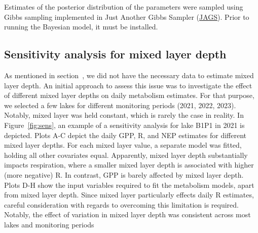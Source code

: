 \documentclass[11pt,lineno]{manuscript}\usepackage[]{graphicx}\usepackage[]{xcolor}
\begin{document}
Estimates of the posterior distribution of the parameters were sampled using
Gibbs sampling implemented in Just Another Gibbs Sampler
(\href{https://sourceforge.net/projects/mcmc-jags/files/}{JAGS}). Prior to running
the Bayesian model, it must be installed.

\subsection{Sensitivity analysis for mixed layer depth} \label{subsec:sens}

As mentioned in section~, we did not have the necessary
data to estimate mixed layer depth. An initial approach to assess this issue
was to investigate the effect of different mixed layer depths on daily metabolism
estimates. For that purpose, we selected a few lakes for different monitoring
periods (2021, 2022, 2023). Notably, mixed layer
was held constant, which is rarely the case in reality.
In Figure~\ref{fig:sens}, an example of a sensitivity analysis for lake
B1P1 in 2021 is depicted. Plots A-C depict the daily GPP, R, and NEP estimates
for different mixed layer depths. For each mixed layer value, a separate model
was fitted, holding all other covariates equal.
Apparently, mixed layer depth substantially
impacts respiration, where a smaller mixed layer depth is associated with
higher (more negative) R. In contrast, GPP is barely affected by mixed
layer depth. Plots D-H show the input variables required to fit the metabolism
models, apart from mixed layer depth. Since mixed layer particularly
effects daily R estimates, careful consideration with regards to overcoming
this limitation is required. Notably, the effect of variation in mixed layer
depth was consistent across most lakes and monitoring periods
\end{document}
